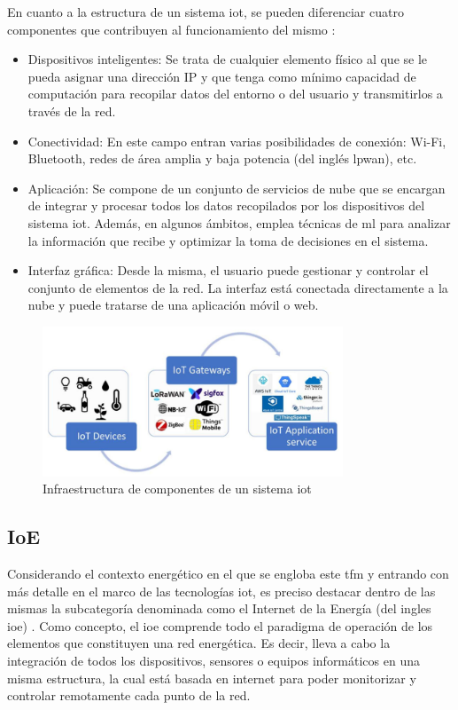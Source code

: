En cuanto a la estructura de un sistema \gls{iot}, se pueden diferenciar cuatro componentes que contribuyen al funcionamiento del mismo \cite{iot} \cite{iotamazon}:

\begin{itemize}
    \item Dispositivos inteligentes: Se trata de cualquier elemento físico al que se le pueda asignar una dirección IP y que tenga como mínimo capacidad de computación para recopilar datos del entorno o del usuario y transmitirlos a través de la red. 
    \item Conectividad: En este campo entran varias posibilidades de conexión: Wi-Fi, Bluetooth, redes de área amplia y baja potencia (del inglés \gls{lpwan}), etc.
    \item Aplicación: Se compone de un conjunto de servicios de nube que se encargan de integrar y procesar todos los datos recopilados por los dispositivos del sistema \gls{iot}. Además, en algunos ámbitos, emplea técnicas de \gls{ml} para analizar la información que recibe y optimizar la toma de decisiones en el sistema.
    \item Interfaz gráfica: Desde la misma, el usuario puede gestionar y controlar el conjunto de elementos de la red. La interfaz está conectada directamente a la nube y puede tratarse de una aplicación móvil o web.
\end{itemize}

\begin{figure}[h!]
    \centering
    \includegraphics[width=0.8\textwidth]{img/teoria/iot.png}
    \caption{Infraestructura de componentes de un sistema \acrshort{iot} \cite{iotscheme}}
    \label{fig:iot}
\end{figure}

\subsection{IoE}
\label{sec:ioe}

Considerando el contexto energético en el que se engloba este \gls{tfm} y entrando con más detalle en el marco de las tecnologías \gls{iot}, es preciso destacar dentro de las mismas la subcategoría denominada como el Internet de la Energía (del ingles \gls{ioe}) \cite{ioe}. Como concepto, el \gls{ioe} comprende todo el paradigma de operación de los elementos que constituyen una red energética. Es decir, lleva a cabo la integración de todos los dispositivos, sensores o equipos informáticos en una misma estructura, la cual está basada en internet para poder monitorizar y controlar remotamente cada punto de la red.

